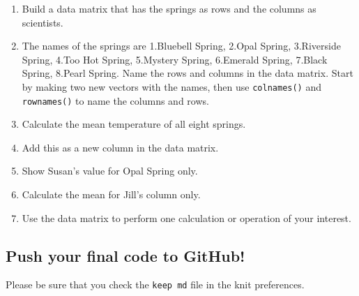 \documentclass[
]{article}
\begin{document}
\begin{enumerate}
\def\labelenumi{\arabic{enumi}.}
\setcounter{enumi}{3}
\item
  Build a data matrix that has the springs as rows and the columns as
  scientists.
\item
  The names of the springs are 1.Bluebell Spring, 2.Opal Spring,
  3.Riverside Spring, 4.Too Hot Spring, 5.Mystery Spring, 6.Emerald
  Spring, 7.Black Spring, 8.Pearl Spring. Name the rows and columns in
  the data matrix. Start by making two new vectors with the names, then
  use \texttt{colnames()} and \texttt{rownames()} to name the columns
  and rows.
\item
  Calculate the mean temperature of all eight springs.
\item
  Add this as a new column in the data matrix.
\item
  Show Susan's value for Opal Spring only.
\item
  Calculate the mean for Jill's column only.
\item
  Use the data matrix to perform one calculation or operation of your
  interest.
\end{enumerate}

\hypertarget{push-your-final-code-to-github}{%
\subsection{Push your final code to
GitHub!}\label{push-your-final-code-to-github}}

Please be sure that you check the \texttt{keep\ md} file in the knit
preferences.
\end{document}
